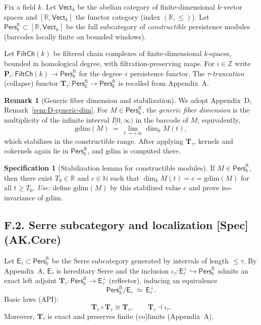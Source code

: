 \documentclass[11pt]{article}
\numberwithin{equation}{section}
\theoremstyle{plain}
\theoremstyle{definition}
\theoremstyle{remark}
\newcommand{\Pers}{\mathsf{Pers}}
\theoremstyle{plain}
\theoremstyle{definition}
\numberwithin{equation}{section}
\theoremstyle{definition}
\newtheorem{remark}[theorem]{Remark}
\newtheorem{specification}[theorem]{Specification}
\numberwithin{equation}{section}
\theoremstyle{plain}
\theoremstyle{definition}
\theoremstyle{remark}
\begin{document}
Fix a field \(k\).
Let \(\mathsf{Vect}_k\) be the abelian category of finite-dimensional \(k\)-vector spaces and
\([\mathbb{R},\mathsf{Vect}_k]\) the functor category (index \((\mathbb{R},\le)\)).
Let \(\Pers^{\mathrm{ft}}_k\subset[\mathbb{R},\mathsf{Vect}_k]\) be the full subcategory of \emph{constructible}
persistence modules (barcodes locally finite on bounded windows).

Let \(\mathsf{FiltCh}(k)\) be filtered chain complexes of finite-dimensional \(k\)-spaces, bounded in homological degree,
with filtration-preserving maps. For \(i\in\mathbb{Z}\) write \(\mathbf{P}_i:\mathsf{FiltCh}(k)\to\Pers^{\mathrm{ft}}_k\)
for the degree–\(i\) persistence functor. The \(\tau\)-\emph{truncation} (collapse) functor
\(\mathbf{T}_\tau:\Pers^{\mathrm{ft}}_k\to\Pers^{\mathrm{ft}}_k\) is recalled from Appendix~A.

\begin{remark}[Generic fiber dimension and stabilization]\label{F:rk:generic-fiber}
We adopt Appendix~D, Remark~\ref{rem:D-generic-dim}. For \(M\in\Pers^{\mathrm{ft}}_k\), the \emph{generic fiber dimension}
is the multiplicity of the infinite interval \(I[0,\infty)\) in the barcode of \(M\); equivalently,
\[
\mathrm{gdim}(M)\ =\ \lim_{t\to +\infty}\dim_k M(t),
\]
which stabilizes in the constructible range.
After applying \(\mathbf{T}_\tau\), kernels and cokernels again lie in \(\Pers^{\mathrm{ft}}_k\), and \(\mathrm{gdim}\)
is computed there.
\end{remark}

\begin{specification}[Stabilization lemma for constructible modules]\label{F:spec:stabilize}
If \(M\in\Pers^{\mathrm{ft}}_k\), then there exist \(T_0\in\mathbb{R}\) and \(c\in\mathbb{N}\) such that
\(\dim_k M(t)=c=\mathrm{gdim}(M)\) for all \(t\ge T_0\).
\emph{Use:} define \(\mathrm{gdim}(M)\) by this stabilized value \(c\) and prove iso-invariance of \(\mathrm{gdim}\).
\end{specification}

\subsection*{F.2. Serre subcategory and localization [Spec] (AK.Core)}

Let \(\mathsf{E}_\tau\subset \Pers^{\mathrm{ft}}_k\) be the Serre subcategory generated by intervals of length \(\le\tau\).
By Appendix~A, \(\mathsf{E}_\tau\) is hereditary Serre and the inclusion
\(\iota_\tau:\mathsf{E}_\tau^\perp\hookrightarrow \Pers^{\mathrm{ft}}_k\) admits an exact left adjoint
\(\mathbf{T}_\tau:\Pers^{\mathrm{ft}}_k\to \mathsf{E}_\tau^\perp\) (reflector), inducing an equivalence
\[
\Pers^{\mathrm{ft}}_k/\mathsf{E}_\tau\ \simeq\ \mathsf{E}_\tau^\perp.
\]
Basic laws (API):
\[
\mathbf{T}_\tau\circ \mathbf{T}_\tau \cong \mathbf{T}_\tau,\qquad \mathbf{T}_\tau \dashv \iota_\tau .
\]
Moreover, \(\mathbf{T}_\tau\) is exact and preserves finite (co)limits (Appendix~A).
\end{document}
